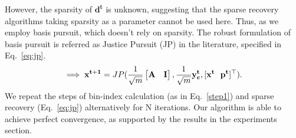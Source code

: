 However, the sparsity of $\mathbf{d^t}$ is unknown, suggesting that the sparse recovery algorithms taking sparsity as a parameter cannot be used here. Thus, as we employ basis pursuit, which doesn't rely on sparsity. The robust formulation of basis pursuit is referred as Justice Pursuit (JP) \cite{Laska2009} in the literature, specified in Eq.~\ref{eq:jp}.
\begin{equation}
\implies \mathbf{{x^{t+1}}} = JP(\frac{1}{\sqrt{m}}\begin{bmatrix} \mathbf{A} & \mathbf{I} \end{bmatrix},\frac{1}{\sqrt{m}}\mathbf{y^t_c},[\mathbf{x^t~~p^t}]^\top).
\label{eq:jp}
\end{equation}
We repeat the steps of bin-index calculation (as in Eq.~\ref{step1}) and sparse recovery (Eq.~\ref{eq:jp}) alternatively for $\mathrm{N}$ iterations. Our algorithm is able to achieve perfect convergence, as supported by the results in the experiments section.

